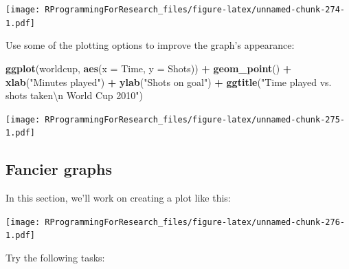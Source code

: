 \documentclass[]{book}
\makeatletter
\newenvironment{Shaded}{\begin{snugshade}}{\end{snugshade}}
\newcommand{\KeywordTok}[1]{\textcolor[rgb]{0.13,0.29,0.53}{\textbf{#1}}}
\newcommand{\DataTypeTok}[1]{\textcolor[rgb]{0.13,0.29,0.53}{#1}}
\newcommand{\CharTok}[1]{\textcolor[rgb]{0.31,0.60,0.02}{#1}}
\newcommand{\StringTok}[1]{\textcolor[rgb]{0.31,0.60,0.02}{#1}}
\newcommand{\OperatorTok}[1]{\textcolor[rgb]{0.81,0.36,0.00}{\textbf{#1}}}
\newcommand{\NormalTok}[1]{#1}
\newenvironment{kframe}{%
\medskip{}
\setlength{\fboxsep}{.8em}
 \def\at@end@of@kframe{}%
 \ifinner\ifhmode%
  \def\at@end@of@kframe{\end{minipage}}%
  \begin{minipage}{\columnwidth}%
 \fi\fi%
 \def\FrameCommand##1{\hskip\@totalleftmargin \hskip-\fboxsep
 \colorbox{shadecolor}{##1}\hskip-\fboxsep
     \hskip-\linewidth \hskip-\@totalleftmargin \hskip\columnwidth}%
 \MakeFramed {\advance\hsize-\width
   \@totalleftmargin\z@ \linewidth\hsize
   \@setminipage}}%
 {\par\unskip\endMakeFramed%
 \at@end@of@kframe}
\renewenvironment{Shaded}{\begin{kframe}}{\end{kframe}}
\theoremstyle{definition}
\theoremstyle{definition}
\theoremstyle{definition}
\theoremstyle{remark}
\makeatother
\begin{document}
\texttt{[image: RProgrammingForResearch\_files/figure-latex/unnamed-chunk-274-1.pdf]}

Use some of the plotting options to improve the graph's appearance:

\begin{Shaded}
\begin{Highlighting}[]
\KeywordTok{ggplot}\NormalTok{(worldcup, }\KeywordTok{aes}\NormalTok{(}\DataTypeTok{x =}\NormalTok{ Time, }\DataTypeTok{y =}\NormalTok{ Shots)) }\OperatorTok{+}\StringTok{ }
\StringTok{  }\KeywordTok{geom_point}\NormalTok{() }\OperatorTok{+}\StringTok{ }
\StringTok{  }\KeywordTok{xlab}\NormalTok{(}\StringTok{"Minutes played"}\NormalTok{) }\OperatorTok{+}\StringTok{ }
\StringTok{  }\KeywordTok{ylab}\NormalTok{(}\StringTok{"Shots on goal"}\NormalTok{) }\OperatorTok{+}\StringTok{ }
\StringTok{  }\KeywordTok{ggtitle}\NormalTok{(}\StringTok{"Time played vs. shots taken}\CharTok{\textbackslash{}n}\StringTok{ World Cup 2010"}\NormalTok{)}
\end{Highlighting}
\end{Shaded}

\texttt{[image: RProgrammingForResearch\_files/figure-latex/unnamed-chunk-275-1.pdf]}

\subsection{Fancier graphs}\label{fancier-graphs}

In this section, we'll work on creating a plot like this:

\texttt{[image: RProgrammingForResearch\_files/figure-latex/unnamed-chunk-276-1.pdf]}

Try the following tasks:
\end{document}
